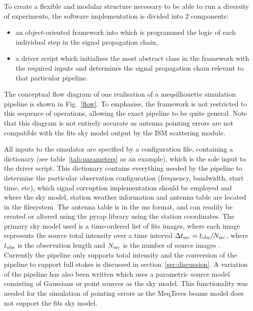 To create a flexible and modular structure necessary to be able to run a diversity of experiments, the software implementation is divided into 2 components:
\begin{itemize}
 \item an object-oriented framework into which is programmed the logic of each individual step in the signal propagation chain,
 \item a driver script which initialises the most abstract class in the framework with the required inputs and determines the signal propagation chain relevant to that particular pipeline.
\end{itemize}
The conceptual flow diagram of one realisation of a {\sc meqsilhouette} simulation pipeline is shown in Fig.~\ref{flow}. To emphasise, the framework is not restricted to this sequence of operations, allowing the exact pipeline to be quite general. Note that this diagram is not entirely accurate as antenna pointing errors are not compatible with the {\sc fits} sky model output by the ISM scattering module.


All inputs to the simulator are specified by a configuration file, containing a dictionary (see table~\ref{tab:parameters} as an example), which is the sole input to the driver script. This dictionary contains everything needed by the pipeline to determine the particular observation configuration (frequency, bandwidth, start time, etc), which signal corruption implementation should be employed and where the sky model, station weather information and antenna table are located in the filesystem. The antenna table is in the {\sc ms} format, and can readily be created or altered using the {\sc pyrap} library using the station coordinates. The primary sky model used is a time-ordered list of {\sc fits} images, where each image represents the source total intensity over a time interval $\Delta t_{\rm src} = t_{\rm obs}/N_{\rm src}$, where $t_{\rm obs}$ is the observation length and $N_{\rm src}$ is the number of source images \citep{Blecher_2016}. Currently the pipeline only supports total intensity and the conversion of the pipeline to support full stokes is discussed in section~\ref{sec:discussion}. A variation of the pipeline has also been written which uses a parametric source model consisting of Gaussians or point sources as the sky model. This functionality was needed for the simulation of pointing errors as the {\sc MeqTrees} beams model does not support the {\sc fits} sky model.

